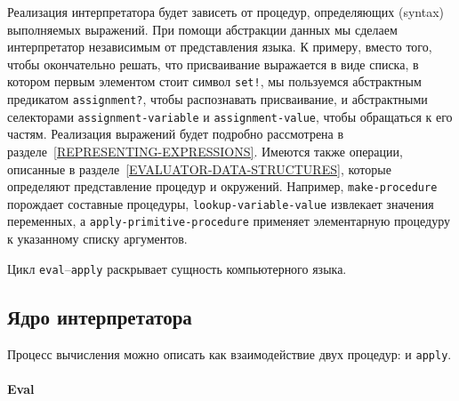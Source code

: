 Реализация интерпретатора будет зависеть от процедур, 
определяющих
 (syntax) выполняемых выражений.
При помощи абстракции данных мы сделаем интерпретатор
независимым от представления языка.  К примеру, вместо того, чтобы
окончательно решать, что присваивание выражается в виде списка, в
котором первым элементом стоит символ {\tt set!}, мы пользуемся
абстрактным предикатом {\tt assignment?}, чтобы распознавать
присваивание, и абстрактными селекторами
{\tt assignment-variable} и {\tt assignment-value},
чтобы обращаться к его частям.  Реализация выражений будет подробно
рассмотрена в разделе~\ref{REPRESENTING-EXPRESSIONS}.
Имеются также операции, описанные в 
разделе~\ref{EVALUATOR-DATA-STRUCTURES}, которые определяют
представление процедур и окружений.  Например,
{\tt make-proce\-dure} порождает составные процедуры, %
{\tt lookup-variable-value} извлекает значения переменных, а
{\tt apply-primitive-procedure} применяет элементарную
процедуру к указанному списку аргументов.

\begin{cntrfig}

\caption{
Цикл {\tt eval}--{\tt apply}
раскрывает сущность компьютерного языка.}
\label{P4.1}%
\end{cntrfig}

\subsection{Ядро интерпретатора}
\label{THE-CORE-OF-THE-EVALUATOR}%


Процесс вычисления можно описать как взаимодействие двух
процедур:  и {\tt apply}.

\paragraph{Eval}


